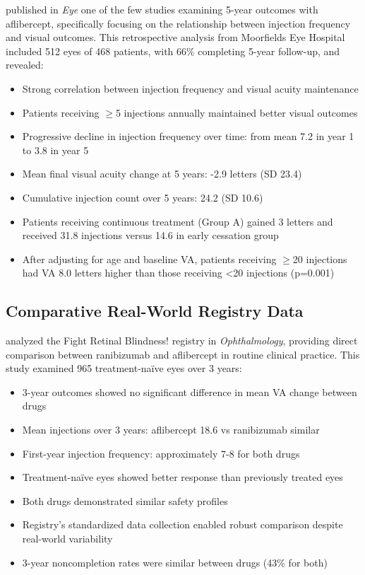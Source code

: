 \citet{kimImpactInjectionFrequency2020} published in \textit{Eye} one of the few studies examining 5-year outcomes with aflibercept, specifically focusing on the relationship between injection frequency and visual outcomes. This retrospective analysis from Moorfields Eye Hospital included 512 eyes of 468 patients, with 66\% completing 5-year follow-up, and revealed:

\begin{itemize}
    \item Strong correlation between injection frequency and visual acuity maintenance
    \item Patients receiving $\geq$5 injections annually maintained better visual outcomes
    \item Progressive decline in injection frequency over time: from mean 7.2 in year 1 to 3.8 in year 5
    \item Mean final visual acuity change at 5 years: -2.9 letters (SD 23.4)
    \item Cumulative injection count over 5 years: 24.2 (SD 10.6)
    \item Patients receiving continuous treatment (Group A) gained 3 letters and received 31.8 injections versus 14.6 in early cessation group
    \item After adjusting for age and baseline VA, patients receiving $\geq$20 injections had VA 8.0 letters higher than those receiving <20 injections (p=0.001)
\end{itemize}

\subsection{Comparative Real-World Registry Data}

\citet{gilliesTreatmentOutcomesRanibizumab2019} analyzed the Fight Retinal Blindness! registry in \textit{Ophthalmology}, providing direct comparison between ranibizumab and aflibercept in routine clinical practice. This study examined 965 treatment-naïve eyes over 3 years:

\begin{itemize}
    \item 3-year outcomes showed no significant difference in mean VA change between drugs
    \item Mean injections over 3 years: aflibercept 18.6 vs ranibizumab similar
    \item First-year injection frequency: approximately 7-8 for both drugs
    \item Treatment-naïve eyes showed better response than previously treated eyes
    \item Both drugs demonstrated similar safety profiles
    \item Registry's standardized data collection enabled robust comparison despite real-world variability
    \item 3-year noncompletion rates were similar between drugs (43\% for both)
\end{itemize}

